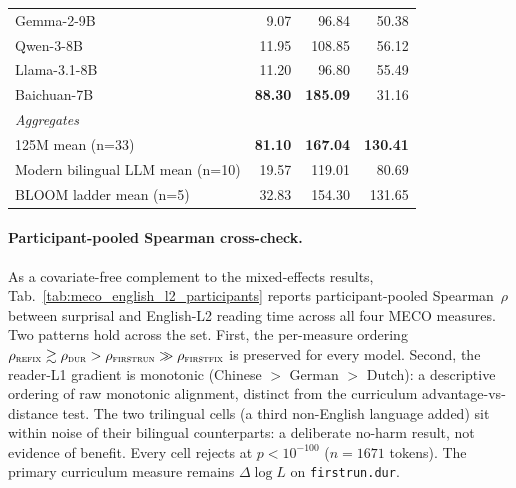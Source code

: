 \begin{table}[!ht]
\begin{tabular}{lrrr}
    Gemma-2-9B            & 9.07 & 96.84 & 50.38 \\
    Qwen-3-8B             & 11.95 & 108.85 & 56.12 \\
    Llama-3.1-8B          & 11.20 & 96.80 & 55.49 \\
    Baichuan-7B           & \textbf{88.30} & \textbf{185.09} & 31.16 \\
    \midrule
    \multicolumn{4}{l}{\textit{Aggregates}} \\
    \midrule
    \beetle{} 125M mean (n=33)        & \textbf{81.10} & \textbf{167.04} & \textbf{130.41} \\
    Modern bilingual LLM mean (n=10)  & 19.57 & 119.01 & 80.69 \\
    BLOOM ladder mean (n=5)           & 32.83 & 154.30 & 131.65 \\
    \bottomrule
  \end{tabular}
\end{table}
 
\paragraph{Participant-pooled Spearman cross-check.} As a covariate-free complement to the mixed-effects results, Tab.~\ref{tab:meco_english_l2_participants} reports participant-pooled Spearman~$\rho$ between \beetle{} surprisal and English-L2 reading time across all four MECO measures. Two patterns hold across the set. First, the per-measure ordering $\rho_\textsc{refix} \gtrsim \rho_\textsc{dur} > \rho_\textsc{firstrun} \gg \rho_\textsc{firstfix}$ is preserved for every model. Second, the reader-L1 gradient is monotonic (Chinese $>$ German $>$ Dutch): a descriptive ordering of raw monotonic alignment, distinct from the curriculum advantage-vs-distance test. The two trilingual cells (a third non-English language added) sit within noise of their bilingual counterparts: a deliberate no-harm result, not evidence of benefit. Every cell rejects at $p<10^{-100}$ ($n=1671$ tokens). The primary curriculum measure remains $\Delta\log L$ on \texttt{firstrun.dur}.
 
